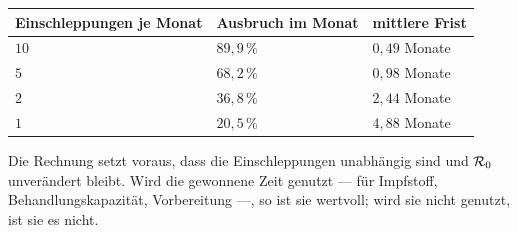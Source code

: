 \begin{aufgabe}
\begin{center}
\renewcommand{\arraystretch}{1.48}
\begin{tabular}{@{}P{3.2cm}P{2.2cm}P{2.4cm}@{}}
\toprule
\textbf{Einschlep\-pungen je Monat} & \textbf{Ausbruch im Monat} & \textbf{mittlere Frist}\\
\midrule
$10$ & $89{,}9\,\%$ & $0{,}49$ Monate\\
$5$ & $68{,}2\,\%$ & $0{,}98$ Monate\\
$2$ & $36{,}8\,\%$ & $2{,}44$ Monate\\
$1$ & $20{,}5\,\%$ & $4{,}88$ Monate\\
\bottomrule
\end{tabular}
\end{center}

\begin{center}
\begin{minipage}{0.88\textwidth}
\end{minipage}
\end{center}

Die Rechnung setzt voraus, dass die Einschleppungen unabhängig sind und $\mathcal{R}_0$ unverändert bleibt. Wird die gewonnene Zeit genutzt --- für Impfstoff, Behandlungskapazität, Vorbereitung ---, so ist sie wertvoll; wird sie nicht genutzt, ist sie es nicht.

\begin{center}
\begin{minipage}{0.86\textwidth}
\end{minipage}
\end{center}
\end{aufgabe}

